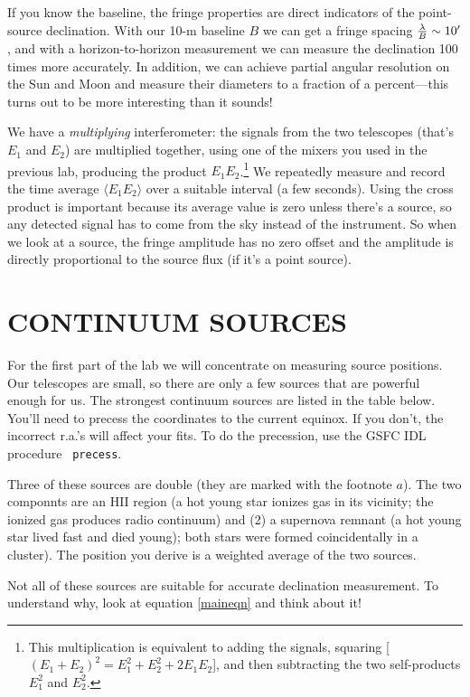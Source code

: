 \documentclass[11pt,preprint]{aastex}
\begin{document}
 If you know the baseline, the fringe properties are direct indicators
of the point-source declination.  With our 10-m baseline $B$ we can get
a fringe spacing ${\lambda \over B}\sim 10'$, and with a
horizon-to-horizon measurement we can measure the declination 100 times
more accurately.  In addition, we can achieve partial angular resolution
on the Sun and Moon and measure their diameters to a fraction of a
percent---this turns out to be more interesting than it sounds!

We have a {\it multiplying} interferometer: the signals from the two
telescopes (that's $E_1$ and $E_2$) are multiplied together, using one
of the mixers you used in the previous lab, producing the product
$E_1E_2$.\footnote{This multiplication is equivalent to adding the
signals, squaring [$(E_1 + E_2)^2 = E_1^2 + E_2^2 + 2E_1E_2$], and then
subtracting the two self-products $E_1^2$ and $E_2^2$.} We repeatedly
measure and record the time average $\langle E_1E_2 \rangle$ over a
suitable interval (a few seconds). Using the cross product is important
because its average value is zero unless there's a source, so any
detected signal has to come from the sky instead of the instrument.  So
when we look at a source, the fringe amplitude has no zero offset and
the amplitude is directly proportional to the source flux (if it's a
point source).


\section {CONTINUUM SOURCES}

	For the first part of the lab we will concentrate on measuring
source positions. Our telescopes are small, so there are only a few
sources that are powerful enough for us. The strongest continuum sources
are listed in the table below.  You'll need to precess the coordinates
to the current equinox. If you don't, the incorrect r.a.'s will affect
your fits. To do the precession, use the GSFC IDL procedure {\tt
precess}.

Three of these sources are double (they are marked with the footnote
$a$). The two componnts are an HII region (a hot young star ionizes gas
in its vicinity; the ionized gas produces radio continuum) and (2) a
supernova remnant (a hot young star lived fast and died young); both
stars were formed coincidentally in a cluster). The position you derive
is a weighted average of the two sources. 

Not all of these sources are suitable for accurate declination
measurement. To understand why, look at equation \ref {maineqn} and
think about it!
\end{document}
